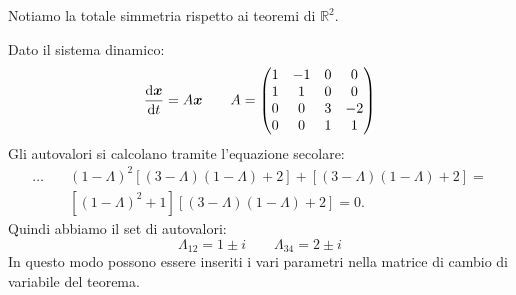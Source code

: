 \noindent
Notiamo la totale simmetria rispetto ai teoremi di $\mathbb{R}^2$.
\begin{exmp}
    Dato il sistema dinamico:
    \[
	\frac{\text{d} \boldsymbol{x}}{\text{d} t} = A \boldsymbol{x}  \qquad 
	A = 
	\begin{pmatrix} 
	    1 & - 1 & 0 & 0 \\
	    1 & 1 & 0 & 0 \\
	    0 & 0 & 3 & -2 \\
	    0 & 0 & 1 & 1
        \end{pmatrix} 
    \] 
    Gli autovalori si calcolano tramite l'equazione secolare:
    \[\begin{aligned}
	\ldots \quad &(1-\Lambda)^2\left[(3-\Lambda)(1-\Lambda)+2\right]+\left[(3-\Lambda)(1-\Lambda)+2\right] = \\
		     &\left[(1-\Lambda)^2 + 1\right]\left[(3-\Lambda)(1-\Lambda) +2\right]= 0
    .\end{aligned}\]
    Quindi abbiamo il set di autovalori:
    \[
        \Lambda_{12} = 1 \pm i \qquad \Lambda_{34} = 2\pm i
    \] 
    In questo modo possono essere inseriti i vari parametri nella matrice di cambio di variabile del teorema.
\end{exmp}
\noindent

